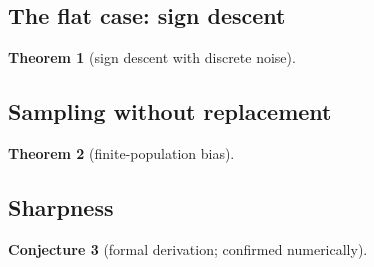 \documentclass[10pt]{article}
\newtheorem{theorem}{Theorem}
\newtheorem{conjecture}[theorem]{Conjecture}
\theoremstyle{definition}
\theoremstyle{remark}
\begin{document}
\subsection{The flat case: sign descent}
\begin{theorem}[sign descent with discrete noise]\label{thm:sign}\StmtSign\end{theorem}


\subsection{Sampling without replacement}
\begin{theorem}[finite-population bias]\label{thm:wor}\StmtWor\end{theorem}


\subsection{Sharpness}
\begin{conjecture}[formal derivation; confirmed numerically]\label{prop:lattice2}\StmtLattice\end{conjecture}






\end{document}
